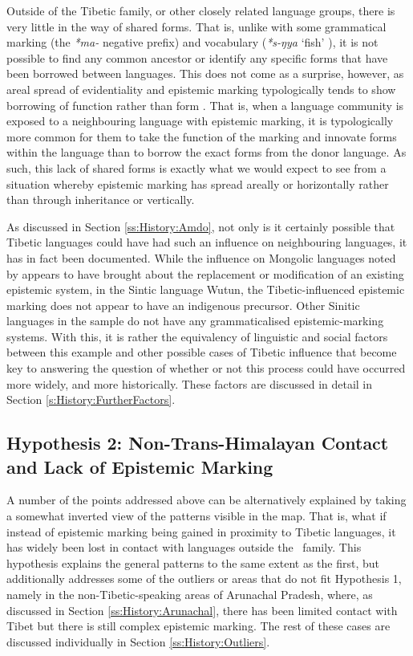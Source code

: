 Outside of the Tibetic family, or other closely related language groups, there is very little in the way of shared forms. That is, unlike with some grammatical marking (the \textit{*ma-} negative prefix) and vocabulary (\textit{*s-ŋya} `fish' \cite{STEDT}), it is not possible to find any common ancestor or identify any specific forms that have been borrowed between languages. This does not come as a surprise, however, as areal spread of evidentiality and epistemic marking typologically tends to show borrowing of function rather than form \cite{Aikhenvald2004}. That is, when a language community is exposed to a neighbouring language with epistemic marking, it is typologically more common for them to take the function of the marking and innovate forms within the language than to borrow the exact forms from the donor language. As such, this lack of shared forms is exactly what we would expect to see from a situation whereby epistemic marking has spread areally or horizontally rather than through inheritance or vertically.

As discussed in Section \ref{ss:History:Amdo}, not only is it certainly possible that Tibetic languages could have had such an influence on neighbouring languages, it has in fact been documented. While the influence on Mongolic languages noted by  appears to have brought about the replacement or modification of an existing epistemic system, in the Sintic language Wutun, the Tibetic-influenced epistemic marking does not appear to have an indigenous precursor. Other Sinitic languages in the sample do not have any grammaticalised epistemic-marking systems. With this, it is rather the equivalency of linguistic and social factors between this example and other possible cases of Tibetic influence that become key to answering the question of whether or not this process could have occurred more widely, and more historically. These factors are discussed in detail in Section \ref{s:History:FurtherFactors}.

\subsection{Hypothesis 2: Non-Trans-Himalayan Contact and Lack of Epistemic Marking}
A number of the points addressed above can be alternatively explained by taking a somewhat inverted view of the patterns visible in the map. That is, what if instead of epistemic marking being gained in proximity to Tibetic languages, it has widely been lost in contact with languages outside the \lfam\ family. This hypothesis explains the general patterns to the same extent as the first, but additionally addresses some of the outliers or areas that do not fit Hypothesis 1, namely in the non-Tibetic-speaking areas of Arunachal Pradesh, where, as discussed in Section \ref{ss:History:Arunachal}, there has been limited contact with Tibet but there is still complex epistemic marking. The rest of these cases are discussed individually in Section \ref{ss:History:Outliers}.

